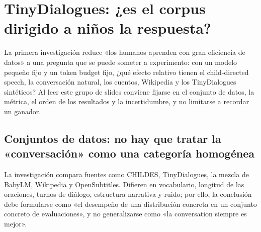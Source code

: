 \section{TinyDialogues: ¿es el corpus dirigido a niños la respuesta?}

La primera investigación reduce «los humanos aprenden con gran eficiencia de datos» a una pregunta que se puede someter a experimento: con un modelo pequeño fijo y un token budget fijo, ¿qué efecto relativo tienen el child-directed speech, la conversación natural, los cuentos, Wikipedia y los TinyDialogues sintéticos? Al leer este grupo de slides conviene fijarse en el conjunto de datos, la métrica, el orden de los resultados y la incertidumbre, y no limitarse a recordar un ganador.






\subsection{Conjuntos de datos: no hay que tratar la «conversación» como una categoría homogénea}

La investigación compara fuentes como CHILDES, TinyDialogues, la mezcla de BabyLM, Wikipedia y OpenSubtitles. Difieren en vocabulario, longitud de las oraciones, turnos de diálogo, estructura narrativa y ruido; por ello, la conclusión debe formularse como «el desempeño de una distribución concreta en un conjunto concreto de evaluaciones», y no generalizarse como «la conversation siempre es mejor».






